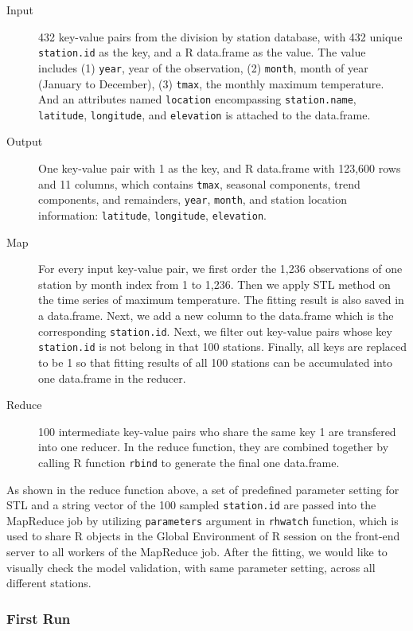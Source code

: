 \begin{description}
  \item[Input] 432 key-value pairs from the division by station database, with 432 
  unique \texttt{station.id} as the key, and a R data.frame as the value. The value 
  includes (1) \texttt{year}, year of the observation, (2) \texttt{month}, month 
  of year (January to December), (3) \texttt{tmax}, the monthly maximum temperature.
  And an attributes named \texttt{location} encompassing \texttt{station.name},
  \texttt{latitude}, \texttt{longitude}, and \texttt{elevation} is attached to the
  data.frame.
  \item[Output] One key-value pair with 1 as the key, and R data.frame with 123,600
  rows and 11 columns, which contains \texttt{tmax}, seasonal components, trend 
  components, and remainders, \texttt{year}, \texttt{month}, and station location 
  information: \texttt{latitude}, \texttt{longitude}, \texttt{elevation}. 
  \item[Map]For every input key-value pair, we first order the 1,236 observations 
  of one station by month index from 1 to 1,236. Then we apply STL method on the 
  time series of maximum temperature. The fitting result is also saved in a 
  data.frame. Next, we add a new column to the data.frame which is the corresponding 
  \texttt{station.id}. Next, we filter out key-value pairs whose key 
  \texttt{station.id} is not belong in that 100 stations. Finally, all keys are 
  replaced to be 1 so that fitting results of all 100 stations can be accumulated 
  into one data.frame in the reducer. \item[Reduce] 100 intermediate key-value 
  pairs who share the same key 1 are transfered into one reducer. In the reduce 
  function, they are combined together by calling R function \texttt{rbind} to 
  generate the final one data.frame. 
\end{description}

As shown in the reduce function above, a set of predefined parameter setting for 
STL and a string vector of the 100 sampled \texttt{station.id} are passed into 
the MapReduce job by utilizing \texttt{parameters} argument in \texttt{rhwatch} 
function, which is used to share R objects in the Global Environment of R session 
on the front-end server to all workers of the MapReduce job. After the fitting, 
we would like to visually check the model validation, with same parameter setting, 
across all different stations.

\subsubsection{First Run}

